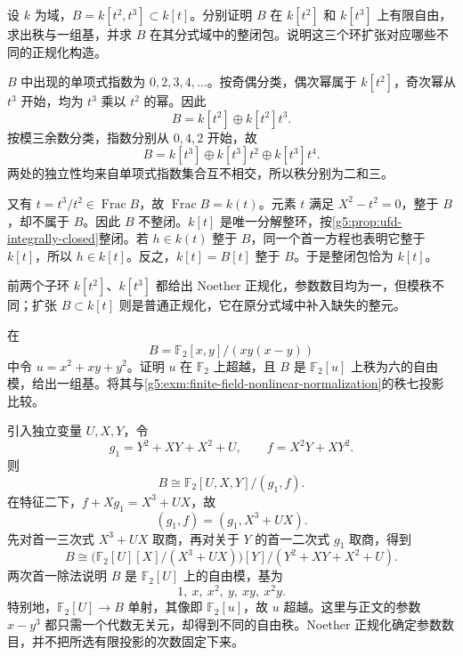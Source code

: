 \begin{exercise}\label{g5:ex:cusp-two-normalizations}
	设 \(k\) 为域，\(B=k[t^2,t^3]\subset k[t]\)。分别证明 \(B\) 在 \(k[t^2]\) 和 \(k[t^3]\) 上有限自由，求出秩与一组基，并求 \(B\) 在其分式域中的整闭包。说明这三个环扩张对应哪些不同的正规化构造。
\end{exercise}
\begin{solution}
	\(B\) 中出现的单项式指数为 \(0,2,3,4,\ldots\)。按奇偶分类，偶次幂属于 \(k[t^2]\)，奇次幂从 \(t^3\) 开始，均为 \(t^3\) 乘以 \(t^2\) 的幂。因此
	\[
		B=k[t^2]\oplus k[t^2]t^3.
	\]
	按模三余数分类，指数分别从 \(0,4,2\) 开始，故
	\[
		B=k[t^3]\oplus k[t^3]t^2\oplus k[t^3]t^4.
	\]
	两处的独立性均来自单项式指数集合互不相交，所以秩分别为二和三。

	又有 \(t=t^3/t^2\in\operatorname{Frac}B\)，故 \(\operatorname{Frac}B=k(t)\)。元素 \(t\) 满足 \(X^2-t^2=0\)，整于 \(B\)，却不属于 \(B\)。因此 \(B\) 不整闭。\(k[t]\) 是唯一分解整环，按\cref{g5:prop:ufd-integrally-closed}整闭。若 \(h\in k(t)\) 整于 \(B\)，同一个首一方程也表明它整于 \(k[t]\)，所以 \(h\in k[t]\)。反之，\(k[t]=B[t]\) 整于 \(B\)。于是整闭包恰为 \(k[t]\)。

	前两个子环 \(k[t^2]\)、\(k[t^3]\) 都给出 Noether 正规化，参数数目均为一，但模秩不同；扩张 \(B\subset k[t]\) 则是普通正规化，它在原分式域中补入缺失的整元。
\end{solution}

\begin{exercise}\label{g5:ex:finite-field-rank-six}
	在
	\[
		B=\mathbb F_2[x,y]/(xy(x-y))
	\]
	中令 \(u=x^2+xy+y^2\)。证明 \(u\) 在 \(\mathbb F_2\) 上超越，且 \(B\) 是 \(\mathbb F_2[u]\) 上秩为六的自由模，给出一组基。将其与\cref{g5:exm:finite-field-nonlinear-normalization}的秩七投影比较。
\end{exercise}
\begin{solution}
	引入独立变量 \(U,X,Y\)，令
	\[
		g_1=Y^2+XY+X^2+U,\qquad f=X^2Y+XY^2.
	\]
	则
	\[
		B\cong\mathbb F_2[U,X,Y]/(g_1,f).
	\]
	在特征二下，\(f+Xg_1=X^3+UX\)，故
	\[
		(g_1,f)=(g_1,X^3+UX).
	\]
	先对首一三次式 \(X^3+UX\) 取商，再对关于 \(Y\) 的首一二次式 \(g_1\) 取商，得到
	\[
		B\cong
		\bigl(\mathbb F_2[U][X]/(X^3+UX)\bigr)[Y]/
		(Y^2+XY+X^2+U).
	\]
	两次首一除法说明 \(B\) 是 \(\mathbb F_2[U]\) 上的自由模，基为
	\[
		1,\ x,\ x^2,\ y,\ xy,\ x^2y.
	\]
	特别地，\(\mathbb F_2[U]\to B\) 单射，其像即 \(\mathbb F_2[u]\)，故 \(u\) 超越。这里与正文的参数 \(x-y^3\) 都只需一个代数无关元，却得到不同的自由秩。Noether 正规化确定参数数目，并不把所选有限投影的次数固定下来。
\end{solution}

